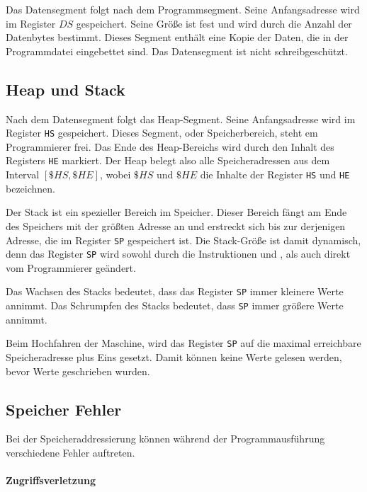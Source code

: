 Das Datensegment folgt nach dem Programmsegment. Seine
Anfangsadresse wird im Register $DS$ gespeichert. Seine
Größe ist fest und wird durch die Anzahl der Datenbytes bestimmt. Dieses Segment
enthält eine Kopie der Daten, die in der Programmdatei eingebettet sind.
Das Datensegment ist nicht schreibgeschützt.

\subsection{Heap und Stack}
\label{subsec:Stack}

Nach dem Datensegment folgt das Heap-Segment. Seine Anfangsadresse
wird im Register \texttt{HS} gespeichert. Dieses Segment,
oder Speicherbereich, steht em Programmierer frei. Das Ende des Heap-Bereichs
wird durch den Inhalt des Registers \texttt{HE} markiert.
Der Heap belegt also alle Speicheradressen aus dem Interval $[\$HS, \$HE]$,
wobei $\$HS$ und $\$HE$ die Inhalte der Register \texttt{HS} und \texttt{HE}
bezeichnen.


Der Stack ist ein spezieller Bereich im Speicher. Dieser Bereich fängt am Ende
des Speichers mit der größten Adresse an und erstreckt sich bis zur derjenigen
Adresse, die im Register \texttt{SP} gespeichert ist. Die
Stack-Größe ist damit dynamisch, denn das Register \texttt{SP} wird sowohl durch
die Instruktionen  und , als auch direkt vom
Programmierer geändert.

Das Wachsen des Stacks bedeutet, dass das Register
\texttt{SP} immer kleinere Werte annimmt. Das Schrumpfen
des Stacks bedeutet, dass \texttt{SP} immer größere Werte annimmt.

Beim Hochfahren der Maschine, wird das Register \texttt{SP} auf die
maximal erreichbare Speicheradresse plus Eins gesetzt. Damit können keine Werte
gelesen werden, bevor Werte geschrieben wurden.



\subsection{Speicher Fehler}
\label{subsec:Speicherfehler}

Bei der Speicheraddressierung können während der Programmausführung
verschiedene Fehler auftreten.

\paragraph{Zugriffsverletzung}

